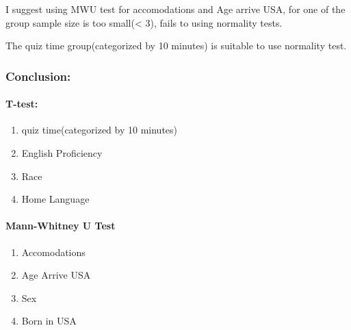 \documentclass[
]{article}
\begin{document}
I suggest using MWU test for accomodations and Age arrive USA, for one
of the group sample size is too small(\textless{} 3), fails to using
normality tests.

The quiz time group(categorized by 10 minutes) is suitable to use
normality test.

\subsubsection{Conclusion:}\label{conclusion}

\paragraph{T-test:}\label{t-test}

\begin{enumerate}
\def\labelenumi{\arabic{enumi}.}
\item
  quiz time(categorized by 10 minutes)
\item
  English Proficiency
\item
  Race
\item
  Home Language
\end{enumerate}

\paragraph{Mann-Whitney U Test}\label{mann-whitney-u-test}

\begin{enumerate}
\def\labelenumi{\arabic{enumi}.}
\item
  Accomodations
\item
  Age Arrive USA
\item
  Sex
\item
  Born in USA
\end{enumerate}
\end{document}
